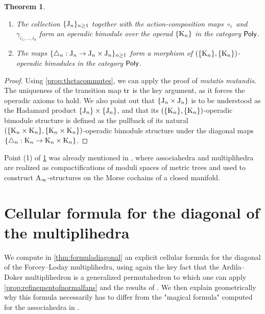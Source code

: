 \documentclass[twoside, 11pt]{amsart}
\newtheorem{theorem}{Theorem}
\theoremstyle{remark}
\begin{document}
\begin{theorem}\label{thm:MainOperad}\leavevmode
\begin{enumerate}[leftmargin=*]
\item The collection $\{\mathrm{J}_n\}_{n\geq 1}$ together with the action-composition maps $\circ_i$ and $\gamma_{i_1,\ldots,i_k}$ form an operadic bimodule over the operad $\{\mathrm{K}_n\}$ in the category $\mathsf{Poly}$. 

\item The maps $\{\triangle_n : \mathrm{J}_n \to \mathrm{J}_n\times \mathrm{J}_n\}_{n\geq 1}$ form a morphism of $(\{\mathrm{K}_n\},\{\mathrm{K}_n\})$-operadic bimodules in the category $\mathsf{Poly}$. 
\end{enumerate}
\end{theorem}

\begin{proof}
Using \cref{prop:thetacommutes}, we can apply the proof of \cite[Theorem~1]{MTTV19} \emph{mutatis mutandis}. The uniqueness of the transition map $\mathrm{tr}$ is the key argument, as it forces the operadic axioms to hold. We also point out that $\{ \mathrm{J}_n\times \mathrm{J}_n \}$ is to be understood as the Hadamard product $\{ \mathrm{J}_n \} \times \{ \mathrm{J}_n \}$, and that its $(\{\mathrm{K}_n\},\{\mathrm{K}_n\})$-operadic bimodule structure is defined as the pullback of its natural $(\{\mathrm{K}_n \times \mathrm{K}_n\},\{\mathrm{K}_n \times \mathrm{K}_n\})$-operadic bimodule structure under the diagonal maps $\{ \triangle_n : \mathrm{K}_n \to \mathrm{K}_n \times \mathrm{K}_n \}$.
\end{proof}

Point (1) of \cref{thm:MainOperad} was already mentioned in \cite[Section 1.2]{mazuir-I}, where associahedra and multiplihedra are realized as compactifications of moduli spaces of metric trees and used to construct $\mathrm{A}_\infty$-structures on the Morse cochains of a closed manifold.


\section{Cellular formula for the diagonal of the multiplihedra} \label{sec:III}

We compute in \cref{thm:formuladiagonal} an explicit cellular formula for the diagonal of the Forcey--Loday multiplihedra, using again the key fact that the Ardila--Doker multiplihedron is a generalized permutahedron to which one can apply \cref{prop:refinementofnormalfans} and the results of \cite{LA21}. We then explain geometrically why this formula necessarily has to differ from the "magical formula" computed for the associahedra in \cite{MTTV19}.
\end{document}

